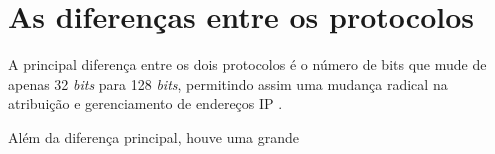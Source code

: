 \section{As diferenças entre os protocolos}\label{sec:protIPv6}

A principal diferença entre os dois protocolos é o número de bits que mude de apenas 32 \textit{bits} para 128 \textit{bits}, permitindo assim uma mudança radical na atribuição e gerenciamento de endereços IP \cite{}.

Além da diferença principal, houve uma grande 
